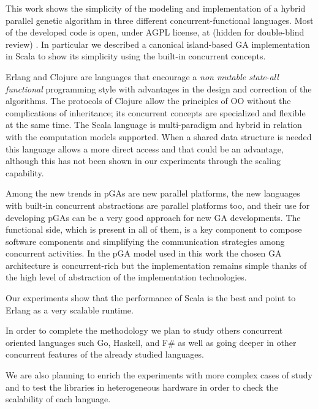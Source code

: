 \noindent This work shows the simplicity of the modeling and implementation of a hybrid parallel genetic algorithm in three different concurrent-functional languages. Most of the developed code is open, under AGPL license, at
(hidden for double-blind review)
. In particular we described a canonical island-based GA implementation in Scala to show its simplicity using the built-in concurrent concepts.

Erlang and Clojure are languages that encourage a \emph{non mutable state}-\emph{all functional} programming style with advantages in the design and correction of the algorithms. The protocols of Clojure allow the principles of OO without the complications of inheritance; its concurrent concepts  are specialized and flexible at the same time. The Scala language is multi-paradigm and hybrid in relation with the computation models supported. When a shared data structure is needed this language allows a more direct access and that could be an advantage, although this has not been shown in our experiments through the scaling capability.

Among the new trends in pGAs are new parallel platforms, the new languages with built-in concurrent abstractions are parallel platforms too, and their use for developing pGAs can be a very good approach for new GA developments. The functional side, which is present in all of them, is a key component to compose software components and simplifying the communication strategies among concurrent activities. In the pGA model used in this work the chosen GA architecture is concurrent-rich but the implementation remains simple thanks of the high level of abstraction of the implementation technologies.

Our experiments show that the performance of Scala is the best and point to Erlang as a very scalable runtime.

In order to complete the methodology we plan to study others concurrent oriented languages such Go, Haskell, and F\# as well as going deeper in other concurrent features of the already studied languages.

We are also planning to enrich the experiments with more complex cases of study and to test the libraries in heterogeneous hardware in order to check the scalability of each language.

